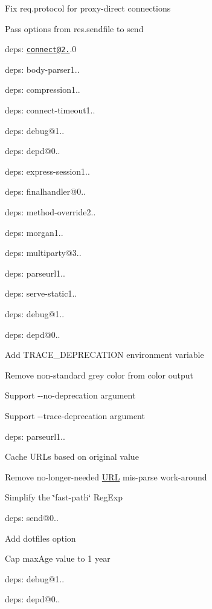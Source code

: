 {\ttfamily 
\begin{DoxyItemize}
\item Fix {\ttfamily req.\+protocol} for proxy-\/direct connections
\item Pass options from {\ttfamily res.\+sendfile} to {\ttfamily send}
\item deps\+: \href{mailto:connect@2.24}{\tt connect@2.}.0
\begin{DoxyItemize}
\item deps\+: body-\/parser1..
\item deps\+: compression1..
\item deps\+: connect-\/timeout1..
\item deps\+: debug@1..
\item deps\+: depd@0..
\item deps\+: express-\/session1..
\item deps\+: finalhandler@0..
\item deps\+: method-\/override2..
\item deps\+: morgan1..
\item deps\+: multiparty@3..
\item deps\+: parseurl1..
\item deps\+: serve-\/static1..
\end{DoxyItemize}
\item deps\+: debug@1..
\item deps\+: depd@0..
\begin{DoxyItemize}
\item Add {\ttfamily T\+R\+A\+C\+E\+\_\+\+D\+E\+P\+R\+E\+C\+A\+T\+I\+ON} environment variable
\item Remove non-\/standard grey color from color output
\item Support {\ttfamily -\/-\/no-\/deprecation} argument
\item Support {\ttfamily -\/-\/trace-\/deprecation} argument
\end{DoxyItemize}
\item deps\+: parseurl1..
\begin{DoxyItemize}
\item Cache U\+R\+Ls based on original value
\item Remove no-\/longer-\/needed \mbox{\hyperlink{namespace_u_r_l}{U\+RL}} mis-\/parse work-\/around
\item Simplify the \char`\"{}fast-\/path\char`\"{} {\ttfamily Reg\+Exp}
\end{DoxyItemize}
\item deps\+: send@0..
\begin{DoxyItemize}
\item Add {\ttfamily dotfiles} option
\item Cap {\ttfamily max\+Age} value to 1 year
\item deps\+: debug@1..
\item deps\+: depd@0..
\end{DoxyItemize}
\end{DoxyItemize}}


